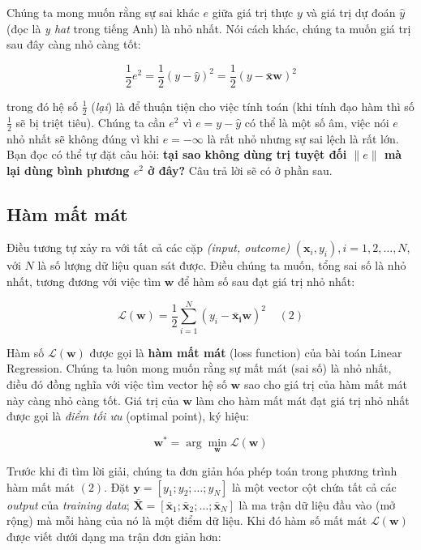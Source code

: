Chúng ta mong muốn rằng sự sai khác $e$ giữa giá trị thực $y$ và giá trị dự đoán $\hat{y}$ (đọc là \textit{y hat} trong tiếng Anh) là nhỏ nhất. Nói cách khác, chúng ta muốn giá trị sau đây càng nhỏ càng tốt:  
 
$$ 
\frac{1}{2}e^2 = \frac{1}{2}(y - \hat{y})^2 = \frac{1}{2}(y - \mathbf{\bar{x}}\mathbf{w})^2 
$$ 
 
trong đó hệ số $\frac{1}{2} $ (\textit{lại}) là để thuận tiện cho việc tính toán (khi tính đạo hàm thì số $\frac{1}{2} $ sẽ bị triệt tiêu). Chúng ta cần $e^2$ vì $e = y - \hat{y} $ có thể là một số âm, việc nói $e$ nhỏ nhất sẽ không đúng vì khi $e = - \infty$ là rất nhỏ nhưng sự sai lệch là rất lớn. Bạn đọc có thể tự đặt câu hỏi: \textbf{tại sao không dùng trị tuyệt đối $ \|e\| $ mà lại dùng bình phương $e^2$ ở đây?} Câu trả lời sẽ có ở phần sau.  
 
 
 
 
 
 
\subsection{Hàm mất mát}
 
Điều tương tự xảy ra với tất cả các cặp \textit{(input, outcome)} $ (\mathbf{x}_i, y_i), i = 1, 2, \dots, N $, với $N$ là số lượng dữ liệu quan sát được. Điều chúng ta muốn, tổng sai số là nhỏ nhất, tương đương với việc tìm $ \mathbf{w} $ để hàm số sau đạt giá trị nhỏ nhất: 
 
$$ \mathcal{L}(\mathbf{w}) = \frac{1}{2}\sum_{i=1}^N (y_i - \mathbf{\bar{x}_i}\mathbf{w})^2 ~~~~~(2) $$  
 
Hàm số $\mathcal{L}(\mathbf{w}) $ được gọi là \textbf{hàm mất mát} (loss function) của bài toán Linear Regression. Chúng ta luôn mong muốn rằng sự mất mát (sai số) là nhỏ nhất, điều đó đồng nghĩa với việc  tìm vector hệ số $ \mathbf{w} $  sao cho  
giá trị của hàm mất mát này càng nhỏ càng tốt. Giá trị của $\mathbf{w}$ làm cho hàm mất mát đạt giá trị nhỏ nhất được gọi là \textit{điểm tối ưu} (optimal point), ký hiệu: 
 
$$ \mathbf{w}^* = \arg\min_{\mathbf{w}} \mathcal{L}(\mathbf{w})  $$  
 
Trước khi đi tìm lời giải, chúng ta đơn giản hóa phép toán trong phương trình hàm mất mát $(2)$. Đặt $\mathbf{y} = [y_1; y_2; \dots; y_N]$ là một vector cột chứa tất cả các \textit{output} của \textit{training data}; $ \mathbf{\bar{X}} = [\mathbf{\bar{x}}_1; \mathbf{\bar{x}}_2; \dots; \mathbf{\bar{x}}_N ] $ là ma trận dữ liệu đầu vào (mở rộng) mà mỗi hàng của nó là một điểm dữ liệu. Khi đó hàm số mất mát $\mathcal{L}(\mathbf{w})$ được viết dưới dạng ma trận đơn giản hơn: 
 
